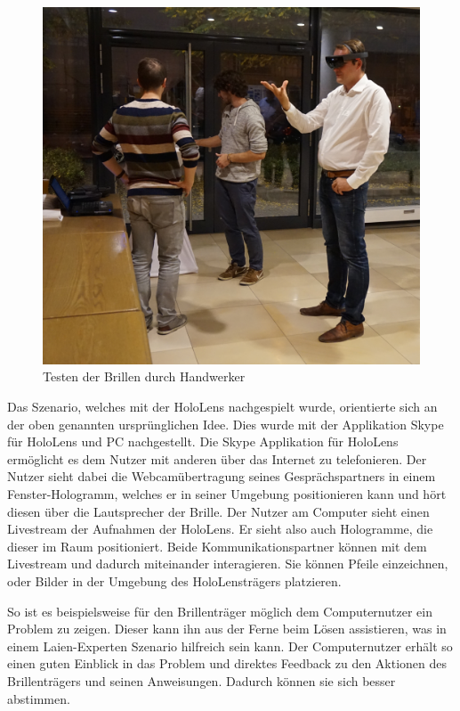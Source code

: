 \begin{figure}[h]
	\begin{center}
		\noindent\includegraphics[width=\linewidth,height=\textheight,keepaspectratio]{Resources/Fokusgruppe2.jpg}
		\caption{Testen der Brillen durch Handwerker}
	\end{center}
\end{figure}

Das Szenario, welches mit der HoloLens nachgespielt wurde, orientierte sich an der oben genannten ursprünglichen Idee. Dies wurde mit der Applikation Skype für HoloLens und PC nachgestellt. Die Skype Applikation für HoloLens ermöglicht es dem Nutzer mit anderen über das Internet zu telefonieren. Der Nutzer sieht dabei die Webcamübertragung seines Gesprächspartners in einem Fenster-Hologramm, welches er in seiner Umgebung positionieren kann und hört diesen über die Lautsprecher der Brille. Der Nutzer am Computer sieht einen Livestream der Aufnahmen der HoloLens. Er sieht also auch Hologramme, die dieser im Raum positioniert. Beide Kommunikationspartner können mit dem Livestream und dadurch miteinander interagieren. Sie können Pfeile einzeichnen, oder Bilder in der Umgebung des HoloLensträgers platzieren. 

So ist es beispielsweise für den Brillenträger möglich dem Computernutzer ein Problem zu zeigen. Dieser kann ihn aus der Ferne beim Lösen assistieren, was in einem Laien-Experten Szenario hilfreich sein kann. Der Computernutzer erhält so einen guten Einblick in das Problem und direktes Feedback zu den Aktionen des Brillenträgers und seinen Anweisungen. Dadurch können sie sich besser abstimmen.

